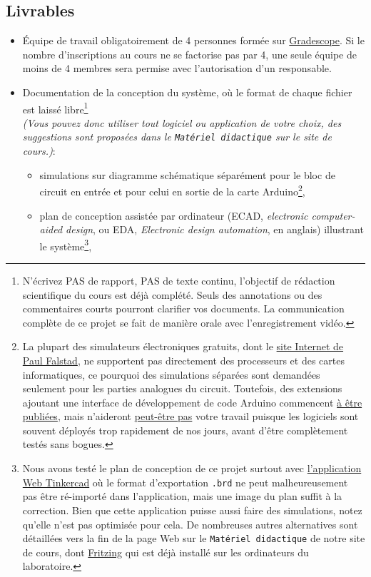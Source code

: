 \documentclass[english,french,12pt]{article}
\begin{document}
\subsection*{Livrables}
\label{subsec:livrables}
\begin{itemize}
    \item Équipe de travail obligatoirement de 4 personnes formée sur \href{https://www.gradescope.com/}{Gradescope}. Si le nombre d'inscriptions au cours ne se factorise pas par 4, une seule équipe de moins de 4 membres sera permise avec l'autorisation d'un responsable.
    \item Documentation de la conception du système, où le format de chaque fichier est laissé libre\footnote{N'écrivez PAS de rapport, PAS de texte continu, l'objectif de rédaction scientifique du cours est déjà complété. Seuls des annotations ou des commentaires courts pourront clarifier vos documents. La communication complète de ce projet se fait de manière orale avec l'enregistrement vidéo.}\\ \textit{(Vous pouvez donc utiliser tout logiciel ou application de votre choix, des suggestions sont proposées dans le \texttt{Matériel didactique} sur le site de cours.)}:
    \begin{itemize}[label=$\bullet$]
        \item simulations sur diagramme schématique séparément pour le bloc de circuit en entrée et pour celui en sortie de la carte Arduino\footnote{La plupart des simulateurs électroniques gratuits, dont le \href{https://www.falstad.com/circuit/}{site Internet de Paul Falstad}, ne supportent pas directement des processeurs et des cartes informatiques, ce pourquoi des simulations séparées sont demandées seulement pour les parties analogues du circuit. Toutefois, des extensions ajoutant une interface de développement de code Arduino commencent \href{http://falstad.com/circuit/avr8js/}{à être publiées}, mais n'aideront \href{https://hackaday.com/2021/06/11/circuit-vr-arduino-virtually-meets-analog/}{peut-être pas} votre travail puisque les logiciels sont souvent déployés trop rapidement de nos jours, avant d'être complètement testés sans bogues.},
        \item plan de conception assistée par ordinateur (ECAD, \textit{electronic computer-aided design}, ou EDA, \textit{Electronic design automation}, en anglais) illustrant le système\footnote{Nous avons testé le plan de conception de ce projet surtout avec \href{https://www.tinkercad.com/login}{l'application Web Tinkercad} où le format d'exportation \texttt{.brd} ne peut malheureusement pas être ré-importé dans l'application, mais une image du plan suffit à la correction. Bien que cette application puisse aussi faire des simulations, notez qu'elle n'est pas optimisée pour cela. De nombreuses autres alternatives sont détaillées vers la fin de la page Web sur le \texttt{Matériel didactique} de notre site de cours, dont \href{https://fritzing.org/}{Fritzing} qui est déjà installé sur les ordinateurs du laboratoire.},

\end{itemize}
\end{itemize}
\end{document}
